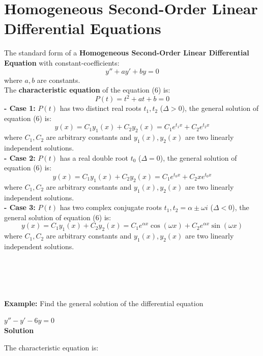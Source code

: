 \documentclass{article}
\begin{document}
\section{Homogeneous Second-Order Linear Differential Equations}
\begin{mybox}
The standard form of a \textbf{Homogeneous Second-Order Linear Differential Equation} with constant-coefficients:
\begin{equation}
    y''+ ay' + by = 0
\end{equation}
where $a,b$ are constants.\\
The \textbf{characteristic equation} of the equation (6) is:
\begin{equation*}
    P(t)=t^2+at+b=0
\end{equation*}
\textbf{- Case 1:} $P(t)$ has two distinct real roots $t_1,t_2$ ($\Delta>0$), the general solution of equation (6) is:
\begin{equation*}
    y(x)=C_1y_1(x)+C_2y_2(x)=C_1e^{t_1x}+C_2e^{t_2x}
\end{equation*}
where $C_1,C_2$ are arbitrary constants and $y_1(x),y_2(x)$ are two linearly independent solutions.\\
\textbf{- Case 2:} $P(t)$ has a real double root $t_0$ ($\Delta=0$), the general solution of equation (6) is:
\begin{equation*}
    y(x)=C_1y_1(x)+C_2y_2(x)=C_1e^{t_0x}+C_2xe^{t_0x}
\end{equation*}
where $C_1,C_2$ are arbitrary constants and $y_1(x),y_2(x)$ are two linearly independent solutions.\\
\textbf{- Case 3:} $P(t)$ has two complex conjugate roots $t_1,t_2=\alpha\pm\omega i$ ($\Delta<0$), the general solution of equation (6) is:
\begin{equation*}
    y(x)=C_1y_1(x)+C_2y_2(x)=C_1e^{\alpha x}\cos(\omega x)+C_2e^{\alpha x}\sin(\omega x)
\end{equation*}
where $C_1,C_2$ are arbitrary constants and $y_1(x),y_2(x)$ are two linearly independent solutions.
\end{mybox}
\ \\\\\\\\
\textbf{Example: }Find the general solution of the differential equation
\begin{center}
    $y''-y'-6y=0$\\
    \textbf{Solution}
\end{center}
The characteristic equation is:
\end{document}
